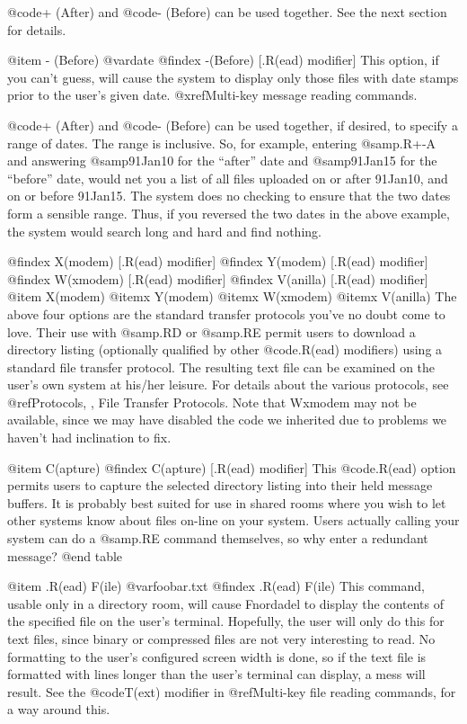 @code{+ (After)} and @code{- (Before)} can be used together.  See the next
section for details.

@item - (Before) @var{date}
@findex -(Before) [.R(ead) modifier]
This option, if you can't guess, will cause the system
to display only those files with date stamps prior to the
user's given date.  @xref{Multi-key message reading commands}.

@code{+ (After)} and @code{- (Before)} can be used together,
if desired, to specify a range of dates.  The range is inclusive.  So,
for example, entering @samp{.R+-A} and answering @samp{91Jan10} for the
``after'' date and @samp{91Jan15} for the ``before'' date, would net
you a list of all files uploaded on or after 91Jan10, and on or before 91Jan15.
The system does no checking to ensure that the two dates form a sensible
range.  Thus, if you reversed the two dates in the above example, the
system would search long and hard and find nothing.

@findex X(modem) [.R(ead) modifier]
@findex Y(modem) [.R(ead) modifier]
@findex W(xmodem) [.R(ead) modifier]
@findex V(anilla) [.R(ead) modifier]
@item X(modem)
@itemx Y(modem)
@itemx W(xmodem)
@itemx V(anilla)
The above four options are the standard transfer protocols you've
no doubt come to love.  Their use with @samp{.RD} or @samp{.RE}
permit users to download a directory listing
(optionally qualified by other @code{.R(ead)} modifiers)
using a standard file transfer protocol.  The resulting text
file can be examined on the user's own system at his/her leisure.
For details about the various protocols, see
@ref{Protocols, , File Transfer Protocols}.  Note that Wxmodem
may not be available, since we may have disabled the code we
inherited due to problems we haven't had inclination to fix.

@item C(apture)
@findex C(apture) [.R(ead) modifier]
This @code{.R(ead)} option permits users to capture the
selected directory listing into their held message buffers.
It is probably best suited for use in shared rooms where you wish
to let other systems know about files on-line on your system.
Users actually calling your system can do a @samp{.RE} command
themselves, so why enter a redundant message?
@end table

@item .R(ead) F(ile) @var{foobar.txt}
@findex .R(ead) F(ile)
This command, usable only in a directory room, will cause
Fnordadel to display the contents of the specified file on the user's
terminal.  Hopefully, the user will only do this for text files, since
binary or compressed files are not very interesting to read.  No
formatting to the user's configured screen width is done, so if the
text file is formatted with lines longer than the user's terminal can
display, a mess will result.  See the @code{T(ext)} modifier in
@ref{Multi-key file reading commands}, for a way around this.

